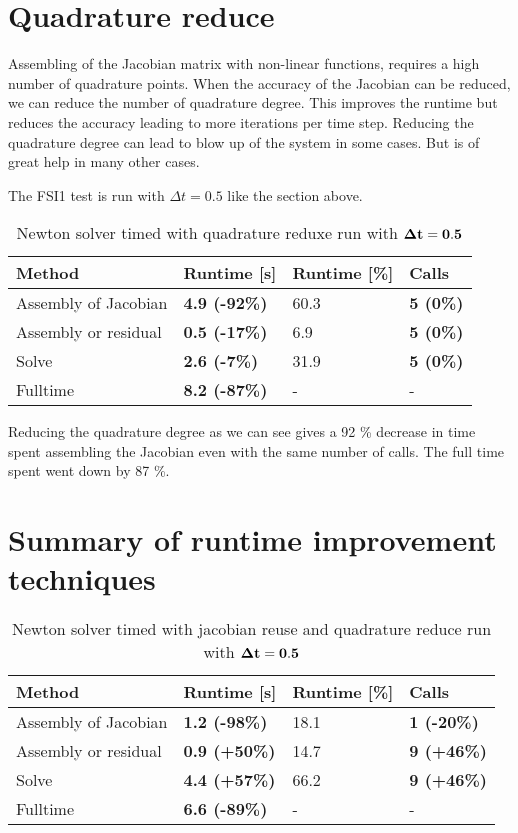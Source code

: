 \section{Quadrature reduce}
Assembling of the Jacobian matrix with non-linear functions, requires a high number of quadrature points. When the accuracy of the Jacobian can be reduced, we can reduce the number of quadrature degree. This improves the runtime but reduces the accuracy leading to more iterations per time step. Reducing the quadrature degree can lead to blow up of the system in some cases. But is of great help in many other cases.\newline

The FSI1 test is run with $\Delta t = 0.5$ like the section above.

\begin{table}[H]
\centering
\caption{Newton solver timed with quadrature reduxe run with $\bold{\Delta t = 0.5}$}
\label{my-label}
\begin{tabular}{|l|l|l|l|}
\hline
Method & \textbf{Runtime {[}s{]}} & Runtime {[}\%{]} & \textbf{Calls} \\ \hline
Assembly of Jacobian & \textbf{4.9 (-92\%)} & 60.3 & \textbf{5 (0\%)} \\ \hline
Assembly or residual & \textbf{0.5 (-17\%)} & 6.9 & \textbf{5 (0\%)} \\ \hline
Solve & \textbf{2.6 (-7\%)} & 31.9 & \textbf{5 (0\%)} \\ \hline
Fulltime & \textbf{8.2 (-87\%)} & - & - \\ \hline
\end{tabular}
\end{table}

Reducing the quadrature degree as we can see gives a 92 \% decrease in time spent assembling the Jacobian even with the same number of calls. The full time spent went down by 87 \%.

\section{Summary of runtime improvement techniques}


\begin{table}[H]
\centering
\caption{Newton solver timed with jacobian reuse and quadrature reduce run with $\bold{\Delta t = 0.5}$}
\label{both_tech}
\begin{tabular}{|l|l|l|l|}
\hline
Method & \textbf{Runtime {[}s{]}} & Runtime {[}\%{]} & \textbf{Calls} \\ \hline
Assembly of Jacobian & \textbf{1.2 (-98\%)} & 18.1 & \textbf{1 (-20\%)} \\ \hline
Assembly or residual & \textbf{0.9 (+50\%)} & 14.7 & \textbf{9 (+46\%)} \\ \hline
Solve & \textbf{4.4 (+57\%)} & 66.2 & \textbf{9 (+46\%)} \\ \hline
Fulltime & \textbf{6.6 (-89\%)} & - & - \\ \hline
\end{tabular}
\end{table}

